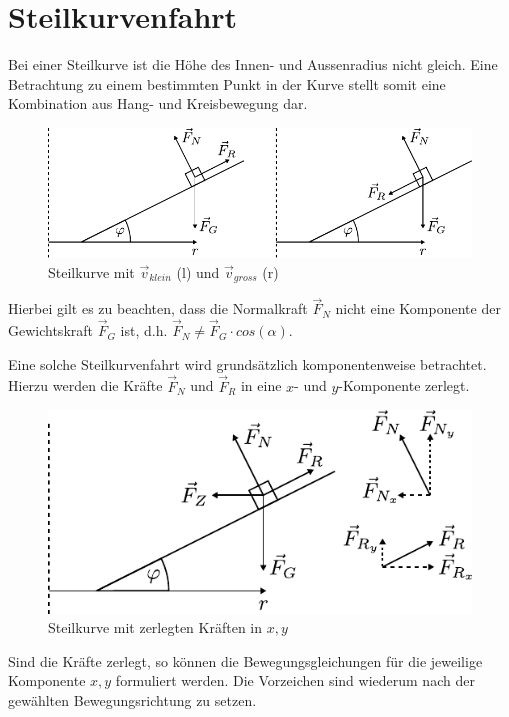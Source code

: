 \newpage
\section{Steilkurvenfahrt}
Bei einer Steilkurve ist die Höhe des Innen- und Aussenradius nicht
gleich. Eine Betrachtung zu einem bestimmten Punkt in der Kurve stellt
somit eine Kombination aus Hang- und Kreisbewegung dar. 

\begin{figure}[h!]
	\centering
	\includegraphics[scale=0.8]{kurve1.pdf}
	\caption{Steilkurve mit 
		$\vec{v}_{klein}$ (l) und $\vec{v}_{gross}$ (r)}
	\label{fig:steilkurve1}
\end{figure}

\noindent
Hierbei gilt es zu beachten, dass die Normalkraft $\vec{F}_N$ nicht 
eine Komponente der Gewichtskraft $\vec{F}_G$ ist, d.h. 
$\vec{F}_N \neq \vec{F}_G \cdot cos(\alpha)$. 

Eine solche Steilkurvenfahrt wird grundsätzlich komponentenweise
betrachtet. Hierzu werden die Kräfte $\vec{F}_N$ und $\vec{F}_R$ in
eine $x$- und $y$-Komponente zerlegt.

\begin{figure}[h!]
	\centering
	\includegraphics[scale=0.8]{kurve2.pdf}
	\caption{Steilkurve mit zerlegten Kräften in $x,y$}
	\label{fig:steilkurve2}
\end{figure}

\noindent
Sind die Kräfte zerlegt, so können die Bewegungsgleichungen für die 
jeweilige Komponente $x,y$ formuliert werden. Die Vorzeichen sind 
wiederum nach der gewählten Bewegungsrichtung zu setzen. 

